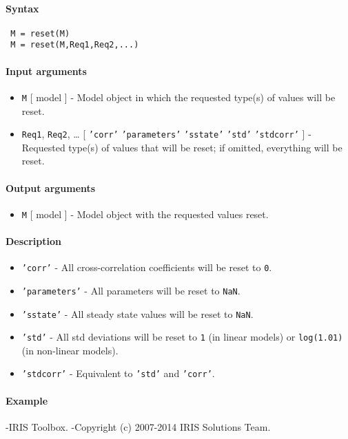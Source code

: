 


	\paragraph{Syntax}
 
 \begin{verbatim}
 M = reset(M)
 M = reset(M,Req1,Req2,...)
 \end{verbatim}
 
 \paragraph{Input arguments}
 
 \begin{itemize}
 \item
   \texttt{M} {[} model {]} - Model object in which the requested type(s)
   of values will be reset.
 \item
   \texttt{Req1}, \texttt{Req2}, \ldots{} {[} \texttt{'corr'} \textbar{}
   \texttt{'parameters'} \textbar{} \texttt{'sstate'} \textbar{}
   \texttt{'std'} \textbar{} \texttt{'stdcorr'} {]} - Requested type(s)
   of values that will be reset; if omitted, everything will be reset.
 \end{itemize}
 
 \paragraph{Output arguments}
 
 \begin{itemize}
 \item
   \texttt{M} {[} model {]} - Model object with the requested values
   reset.
 \end{itemize}
 
 \paragraph{Description}
 
 \begin{itemize}
 \item
   \texttt{'corr'} - All cross-correlation coefficients will be reset to
   \texttt{0}.
 \item
   \texttt{'parameters'} - All parameters will be reset to \texttt{NaN}.
 \item
   \texttt{'sstate'} - All steady state values will be reset to
   \texttt{NaN}.
 \item
   \texttt{'std'} - All std deviations will be reset to \texttt{1} (in
   linear models) or \texttt{log(1.01)} (in non-linear models).
 \item
   \texttt{'stdcorr'} - Equivalent to \texttt{'std'} and \texttt{'corr'}.
 \end{itemize}
 
 \paragraph{Example}
 
 -IRIS Toolbox. -Copyright (c) 2007-2014 IRIS Solutions Team.


